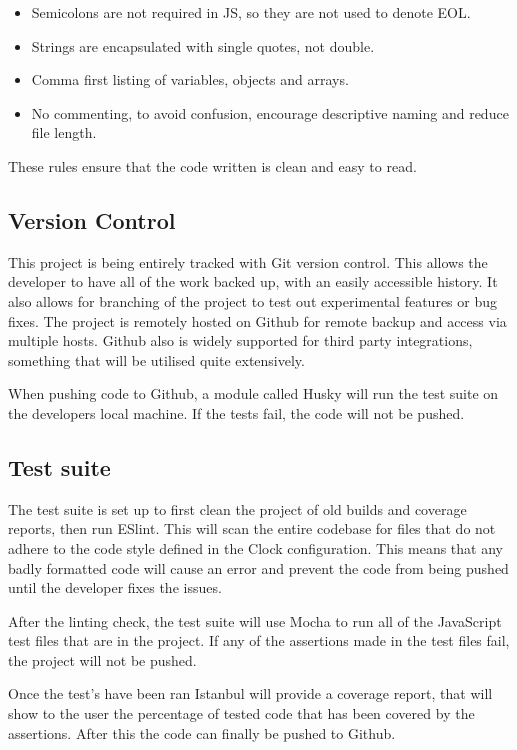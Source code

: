   \begin{itemize}
    \item Semicolons are not required in JS, so they are not used to denote EOL.
    \item Strings are encapsulated with single quotes, not double. 
    \item Comma first\cite{commafirst} listing of variables, objects and arrays.
    \item No commenting, to avoid confusion, encourage descriptive naming and reduce file length.
  \end{itemize}

  These rules ensure that the code written is clean and easy to read.

  \subsection{Version Control}
    This project is being entirely tracked with Git version control. This allows the developer to have all of the work backed up, with an easily accessible history. It also allows for branching of the project to test out experimental features or bug fixes. The project is remotely hosted on Github\cite{github} for remote backup and access via multiple hosts. Github also is widely supported for third party integrations, something that will be utilised quite extensively. 

    When pushing code to Github, a module called Husky\cite{husky} will run the test suite on the developers local machine. If the tests fail, the code will not be pushed.

  \subsection{Test suite}
    The test suite is set up to first clean the project of old builds and coverage reports, then run ESlint\cite{eslint}. This will scan the entire codebase for files that do not adhere to the code style defined in the Clock configuration. This means that any badly formatted code will cause an error and prevent the code from being pushed until the developer fixes the issues. 

    After the linting check, the test suite will use Mocha\cite{mocha} to run all of the JavaScript test files that are in the project. If any of the assertions made in the test files fail, the project will not be pushed. 

    Once the test's have been ran Istanbul\cite{istanbul} will provide a coverage report, that will show to the user the percentage of tested code that has been covered by the assertions. After this the code can finally be pushed to Github. 
    
